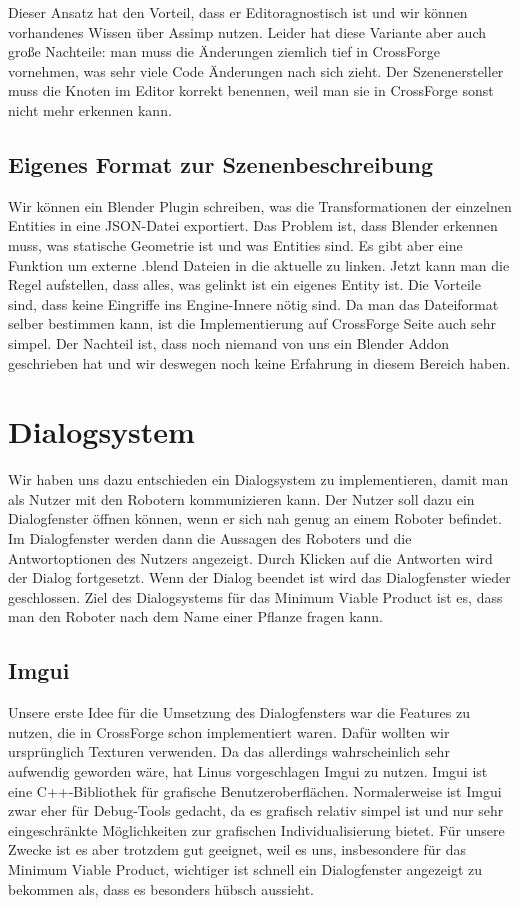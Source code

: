 Dieser Ansatz hat den Vorteil, dass er Editoragnostisch ist und wir können vorhandenes Wissen über Assimp nutzen. Leider hat diese Variante aber auch große Nachteile: man muss die Änderungen ziemlich tief in CrossForge vornehmen, was sehr viele Code Änderungen nach sich zieht. Der Szenenersteller muss die Knoten im Editor korrekt benennen, weil man sie in CrossForge sonst nicht mehr erkennen kann.

\subsection{Eigenes Format zur Szenenbeschreibung}

Wir können ein Blender Plugin schreiben, was die Transformationen der einzelnen Entities in eine JSON-Datei exportiert. Das Problem ist, dass Blender erkennen muss, was statische Geometrie ist und was Entities sind. Es gibt aber eine Funktion um externe .blend Dateien in die aktuelle zu linken. Jetzt kann man die Regel aufstellen, dass alles, was gelinkt ist ein eigenes Entity ist. Die Vorteile sind, dass keine Eingriffe ins Engine-Innere nötig sind. Da man das Dateiformat selber bestimmen kann, ist die Implementierung auf CrossForge Seite auch sehr simpel. Der Nachteil ist, dass noch niemand von uns ein Blender Addon geschrieben hat und wir deswegen noch keine Erfahrung in diesem Bereich haben.

\section{Dialogsystem}

Wir haben uns dazu entschieden ein Dialogsystem zu implementieren, damit man als Nutzer mit den Robotern kommunizieren kann. Der Nutzer soll dazu ein Dialogfenster öffnen können, wenn er sich nah genug an einem Roboter befindet. Im Dialogfenster werden dann die Aussagen des Roboters und die Antwortoptionen des Nutzers angezeigt. Durch Klicken auf die Antworten wird der Dialog fortgesetzt. Wenn der Dialog beendet ist wird das Dialogfenster wieder geschlossen. Ziel des Dialogsystems für das Minimum Viable Product ist es, dass man den Roboter nach dem Name einer Pflanze fragen kann. 

\subsection{Imgui}

Unsere erste Idee für die Umsetzung des Dialogfensters war die Features zu nutzen, die in CrossForge schon implementiert waren. Dafür wollten wir ursprünglich Texturen verwenden. Da das allerdings wahrscheinlich sehr aufwendig geworden wäre, hat Linus vorgeschlagen Imgui zu nutzen.
Imgui ist eine C++-Bibliothek für grafische Benutzeroberflächen. Normalerweise ist Imgui zwar eher für Debug-Tools gedacht, da es grafisch relativ simpel ist und nur sehr eingeschränkte Möglichkeiten zur grafischen Individualisierung bietet. Für unsere Zwecke ist es aber trotzdem gut geeignet, weil es uns, insbesondere für das Minimum Viable Product, wichtiger ist schnell ein Dialogfenster angezeigt zu bekommen als, dass es besonders hübsch aussieht. 


